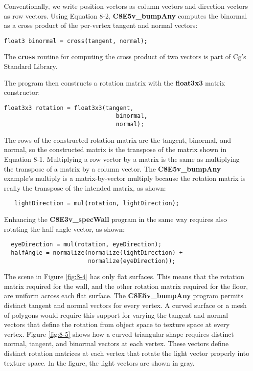 \documentclass[../main.tex]{subfiles}
\begin{document}
Conventionally, we write position vectors as column vectors and direction vectors as row vectors. Using Equation 8-2, \textbf{C8E5v_bumpAny} computes the binormal as a cross product of the per-vertex tangent and normal vectors:

\FloatBarrier
\begin{lstlisting}
float3 binormal = cross(tangent, normal);
\end{lstlisting}
\FloatBarrier

The \textbf{cross} routine for computing the cross product of two vectors is part of Cg's Standard Library.

The program then constructs a rotation matrix with the \textbf{float3x3} matrix constructor:

\FloatBarrier
\begin{lstlisting}
float3x3 rotation = float3x3(tangent,
                                binormal,
                                normal);
\end{lstlisting}
\FloatBarrier

The rows of the constructed rotation matrix are the tangent, binormal, and normal, so the constructed matrix is the transpose of the matrix shown in Equation 8-1. Multiplying a row vector by a matrix is the same as multiplying the transpose of a matrix by a column vector. The \textbf{C8E5v_bumpAny} example's multiply is a matrix-by-vector multiply because the rotation matrix is really the transpose of the intended matrix, as shown:

\FloatBarrier
\begin{lstlisting}
   lightDirection = mul(rotation, lightDirection);
\end{lstlisting}
\FloatBarrier
   
Enhancing the \textbf{C8E3v_specWall} program in the same way requires also rotating the half-angle vector, as shown:

\FloatBarrier
\begin{lstlisting}
  eyeDirection = mul(rotation, eyeDirection);
  halfAngle = normalize(normalize(lightDirection) +
                        normalize(eyeDirection));
\end{lstlisting}
\FloatBarrier

The scene in Figure \ref{fig:8-4} has only flat surfaces. This means that the rotation matrix required for the wall, and the other rotation matrix required for the floor, are uniform across each flat surface. The \textbf{C8E5v_bumpAny} program permits distinct tangent and normal vectors for every vertex. A curved surface or a mesh of polygons would require this support for varying the tangent and normal vectors that define the rotation from object space to texture space at every vertex. Figure \ref{fig:8-5} shows how a curved triangular shape requires distinct normal, tangent, and binormal vectors at each vertex. These vectors define distinct rotation matrices at each vertex that rotate the light vector properly into texture space. In the figure, the light vectors are shown in gray.
\end{document}
